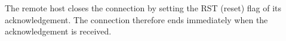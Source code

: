 The remote host closes the connection by setting the RST (reset) flag of its acknowledgement. The connection therefore ends immediately when the acknowledgement is received.